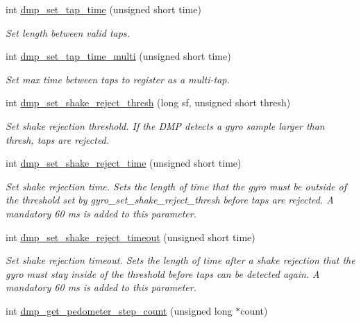 \begin{DoxyCompactItemize}
int \hyperlink{group___d_r_i_v_e_r_s_ga97466067f4a23368f4d7e2547fe359d9}{dmp\+\_\+set\+\_\+tap\+\_\+time} (unsigned short time)
\begin{DoxyCompactList}\small\item\em Set length between valid taps. \end{DoxyCompactList}\item 
int \hyperlink{group___d_r_i_v_e_r_s_gaeca250a90eb816eb2609229849481337}{dmp\+\_\+set\+\_\+tap\+\_\+time\+\_\+multi} (unsigned short time)
\begin{DoxyCompactList}\small\item\em Set max time between taps to register as a multi-\/tap. \end{DoxyCompactList}\item 
int \hyperlink{group___d_r_i_v_e_r_s_ga62efdae1330d5bcaf4c75b069ded0ed0}{dmp\+\_\+set\+\_\+shake\+\_\+reject\+\_\+thresh} (long sf, unsigned short thresh)
\begin{DoxyCompactList}\small\item\em Set shake rejection threshold. If the D\+MP detects a gyro sample larger than {\itshape thresh}, taps are rejected. \end{DoxyCompactList}\item 
int \hyperlink{group___d_r_i_v_e_r_s_ga09d7a6d90e1bd2e907f1866d850c5608}{dmp\+\_\+set\+\_\+shake\+\_\+reject\+\_\+time} (unsigned short time)
\begin{DoxyCompactList}\small\item\em Set shake rejection time. Sets the length of time that the gyro must be outside of the threshold set by {\itshape gyro\+\_\+set\+\_\+shake\+\_\+reject\+\_\+thresh} before taps are rejected. A mandatory 60 ms is added to this parameter. \end{DoxyCompactList}\item 
int \hyperlink{group___d_r_i_v_e_r_s_ga5d44d1a32535000e6902cdc5224d1b54}{dmp\+\_\+set\+\_\+shake\+\_\+reject\+\_\+timeout} (unsigned short time)
\begin{DoxyCompactList}\small\item\em Set shake rejection timeout. Sets the length of time after a shake rejection that the gyro must stay inside of the threshold before taps can be detected again. A mandatory 60 ms is added to this parameter. \end{DoxyCompactList}\item 
int \hyperlink{group___d_r_i_v_e_r_s_gad8f4d1a93e0f03d950559501c5a7255b}{dmp\+\_\+get\+\_\+pedometer\+\_\+step\+\_\+count} (unsigned long $\ast$count)

\end{DoxyCompactItemize}

